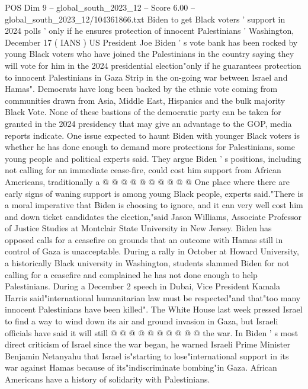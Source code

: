 \begin{textsample}{POS Dim 9 – global\_south\_2023\_12 – Score 6.00 – global\_south\_2023\_12/104361866.txt}  \label{ex:f9_pos_011}
Biden to get Black voters ' support in 2024 polls ' only if he ensures protection of innocent Palestinians ' Washington, December 17 ( IANS ) US President Joe Biden ' s vote bank has been rocked by young Black voters who have joined the Palestinians in the country saying they will vote for him in the 2024 presidential election"only if he guarantees protection to innocent Palestinians in Gaza Strip in the on-going war between Israel and Hamas".
Democrats have long been backed by the ethnic vote coming from communities drawn from Asia, Middle East, Hispanics and the bulk majority Black Vote.
None of these bastions of the democratic party can be taken for granted in the 2024 presidency that may give an advantage to the GOP, media reports indicate.
One issue expected to haunt Biden with younger Black voters is whether he has done enough to demand more protections for Palestinians, some young people and political experts said.
They argue Biden ' s positions, including not calling for an immediate cease-fire, could cost him support from African Americans, traditionally a @ @ @ @ @ @ @ @ @ @ One place where there are early signs of waning support is among young Black people, experts said."There is a moral imperative that Biden is choosing to ignore, and it can very well cost him and down ticket candidates the election,"said Jason Williams, Associate Professor of Justice Studies at Montclair State University in New Jersey.
Biden has opposed calls for a ceasefire on grounds that an outcome with Hamas still in control of Gaza is unacceptable.
During a rally in October at Howard University, a historically Black university in Washington, students slammed Biden for not calling for a ceasefire and complained he has not done enough to help Palestinians.
During a December 2 speech in Dubai, Vice President Kamala Harris said"international humanitarian law must be respected"and that"too many innocent Palestinians have been killed".
The White House last week pressed Israel to find a way to wind down its air and ground invasion in Gaza, but Israeli officials have said it will still @ @ @ @ @ @ @ @ @ @ the war.
In Biden ' s most direct criticism of Israel since the war began, he warned Israeli Prime Minister Benjamin Netanyahu that Israel is"starting to lose"international support in its war against Hamas because of its"indiscriminate bombing"in Gaza.
African Americans have a history of solidarity with Palestinians.

\end{textsample}
